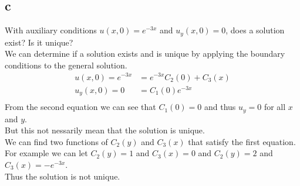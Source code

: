 \documentclass{article}
\begin{document}
\subsection*{c}
With auxiliary conditions $u(x,0) = e^{-3x}$ and $u_y(x,0) = 0$, does a solution exist? Is it unique?\\
We can determine if a solution exists and is unique by applying the boundary conditions to the general solution.\\
\begin{align*}
    u(x,0) = e^{-3x} &= e^{-3x}C_2(0) + C_3(x)\\
    u_y(x,0) = 0 &= C_1(0)e^{-3x}\\
\end{align*}
From the second equation we can see that $C_1(0) = 0$ and thus $u_y = 0$ for all $x$ and $y$.\\
But this not nessarily mean that the solution is unique.\\
We can find two functions of $C_2(y)$ and $C_3(x)$ that satisfy the first equation.\\
For example we can let $C_2(y) = 1$ and $C_3(x) = 0$ and $C_2(y) = 2$ and $C_3(x) = -e^{-3x}$.\\
Thus the solution is not unique.\\
\end{document}
